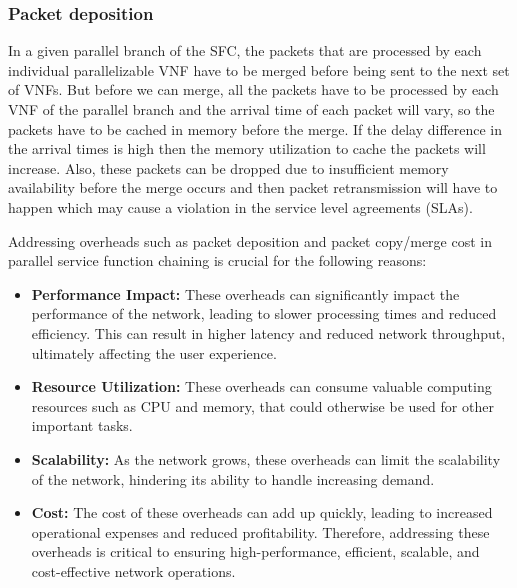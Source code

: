 \documentclass[journal]{IEEEtran}
\begin{document}
\subsubsection{Packet deposition}
In a given parallel branch of the SFC, the packets that are processed by each individual parallelizable VNF have to be merged before being sent to the next set of VNFs. But before we can merge, all the packets have to be processed by each VNF of the parallel branch and the arrival time of each packet will vary, so the packets have to be cached in memory before the merge. If the delay difference in the arrival times is high then the memory utilization to cache the packets will increase. Also, these packets can be dropped due to insufficient memory availability before the merge occurs and then packet retransmission will have to happen which may cause a violation in the service level agreements (SLAs).

Addressing overheads such as packet deposition and packet copy/merge cost in parallel service function chaining is crucial for the following reasons:
\begin{itemize}
    \item \textbf{Performance Impact:} These overheads can significantly impact the performance of the network, leading to slower processing times and reduced efficiency. This can result in higher latency and reduced network throughput, ultimately affecting the user experience.
    \item \textbf{Resource Utilization:} These overheads can consume valuable computing resources such as CPU and memory, that could otherwise be used for other important tasks.
    \item \textbf{Scalability:} As the network grows, these overheads can limit the scalability of the network, hindering its ability to handle increasing demand.
    \item \textbf{Cost:} The cost of these overheads can add up quickly, leading to increased operational expenses and reduced profitability.
Therefore, addressing these overheads is critical to ensuring high-performance, efficient, scalable, and cost-effective network operations.

\end{itemize}
\end{document}
